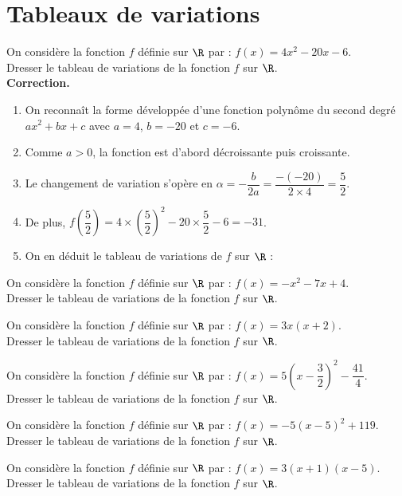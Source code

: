 \documentclass[11pt]{article}
\begin{document}
\section{Tableaux de variations}

\begin{exercice}
 On considère la fonction $f$ définie sur $\R$ par :
 $f(x)=4x^2-20x-6$.\\
 Dresser le tableau de  variations de la fonction $f$ sur
 $\R$. \\
 \textbf{Correction.}
 \begin{enumerate}[label=(\arabic*)]
 \item On reconnaît la forme développée d'une fonction polynôme du
   second degré $ax^2+bx+c$ avec $a=4$, $b=-20$ et $c=-6$.
 \item Comme $a > 0$, la fonction est d'abord décroissante puis croissante.
 \item Le changement de variation s'opère en
   $\alpha=-\dfrac{b}{2a}=\dfrac{-(-20)}{2\times
     4}=\dfrac{5}{2}$. 
 \item De plus, $f\left(\dfrac{5}{2}\right)=4 \times \left(\dfrac{5}{2}
   \right)^2 -20 \times \dfrac{5}{2} -6 = -31$.
 \item On en déduit le tableau de variations de $f$ sur $\R$ :
   \begin{center}
   \end{center}
 \end{enumerate}
\end{exercice}

\begin{exercice}
  \begin{enu}
    \item On considère la fonction $f$ définie sur $\R$ par : $f(x)=-x^2-7x+4$.\\Dresser le tableau de  variations de la fonction $f$ sur $\R$.
	\item On considère la fonction $f$ définie sur $\R$ par : $f(x)=3x(x+2)$.\\Dresser le tableau de  variations de la fonction $f$ sur $\R$.
	\item On considère la fonction $f$ définie sur $\R$ par : $f(x)=5\left(x -\dfrac{3}{2}\right)^2 -\dfrac{41}{4}$.\\Dresser le tableau de  variations de la fonction $f$ sur $\R$.
	\item On considère la fonction $f$ définie sur $\R$ par : $f(x)=-5\left(x -5\right)^2 +119$.\\Dresser le tableau de  variations de la fonction $f$ sur $\R$.
	\item On considère la fonction $f$ définie sur $\R$ par : $f(x)=3(x+1)(x-5)$.\\Dresser le tableau de  variations de la fonction $f$ sur $\R$.
  \end{enu}
\end{exercice}
\end{document}
